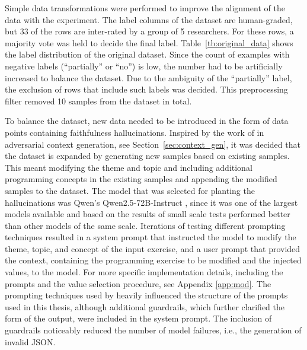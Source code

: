 \documentclass[english, 12pt, a4paper, sci, utf8, a-2b, online]{latex/definitions/aaltothesis}
\begin{document}
Simple data transformations were performed to improve the alignment of the data with the experiment. The label columns of the dataset are human-graded, but 33 of the rows are inter-rated by a group of 5 researchers. For these rows, a majority vote was held to decide the final label. Table~\ref{tb:original_data} shows the label distribution of the original dataset. Since the count of examples with negative labels (``partially'' or ``no'') is low, the number had to be artificially increased to balance the dataset. Due to the ambiguity of the ``partially'' label, the exclusion of rows that include such labels was decided. This preprocessing filter removed 10 samples from the dataset in total. 

\begin{table}
    \centering
    
    \caption{Label distribution of the original dataset}
    \label{tb:original_data}
\end{table}

To balance the dataset, new data needed to be introduced in the form of data points containing faithfulness hallucinations. Inspired by the work of \textcite{ming2025faithevallanguagemodelstay} in adversarial context generation, see Section~\ref{sec:context_gen}, it was decided that the dataset is expanded by generating new samples based on existing samples. This meant modifying the theme and topic and including additional programming concepts in the existing samples and appending the modified samples to the dataset. The model that was selected for planting the hallucinations was Qwen's Qwen2.5-72B-Instruct \cite{yang2024qwen2technicalreport}, since it was one of the largest models available and based on the results of small scale tests performed better than other models of the same scale. Iterations of testing different prompting techniques resulted in a system prompt that instructed the model to modify the theme, topic, and concept of the input exercise, and a user prompt that provided the context, containing the programming exercise to be modified and the injected values, to the model. For more specific implementation details, including the prompts and the value selection procedure, see Appendix \ref{app:mod}. The prompting techniques used by \textcite{ming2025faithevallanguagemodelstay} heavily influenced the structure of the prompts used in this thesis, although additional guardrails, which further clarified the form of the output, were included in the system prompt. The inclusion of guardrails noticeably reduced the number of model failures, i.e., the generation of invalid JSON.
\end{document}
